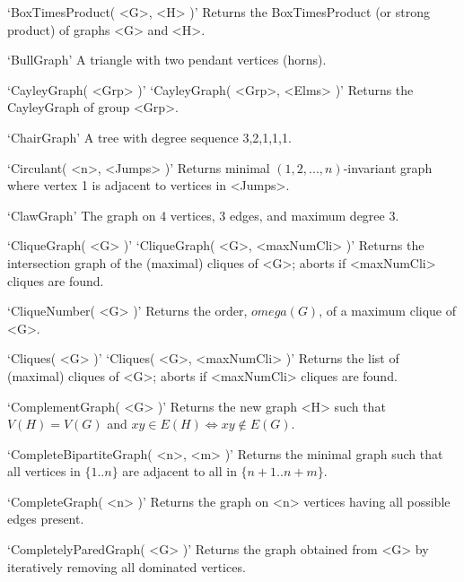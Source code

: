 `BoxTimesProduct( <G>, <H> )'\newline\hglue 5mm 
Returns the BoxTimesProduct (or strong product) of graphs <G> and <H>.

`BullGraph'\newline\hglue 5mm 
A triangle with two pendant vertices (horns).

`CayleyGraph( <Grp> )'\newline
`CayleyGraph( <Grp>, <Elms> )'\newline\hglue 5mm 
Returns the CayleyGraph of group <Grp>.

`ChairGraph'\newline\hglue 5mm 
A tree with degree sequence 3,2,1,1,1.

`Circulant( <n>, <Jumps> )'\newline\hglue 5mm 
Returns minimal $(1, 2, ..., n)$-invariant graph where vertex 1 is adjacent to vertices in <Jumps>.

`ClawGraph'\newline\hglue 5mm 
The graph on 4 vertices, 3 edges, and maximum degree 3.

`CliqueGraph( <G> )'\newline
`CliqueGraph( <G>, <maxNumCli> )'\newline\hglue 5mm 
Returns the intersection graph of the (maximal) cliques of <G>; aborts if <maxNumCli> cliques are found.

`CliqueNumber( <G> )'\newline\hglue 5mm 
Returns the order, $omega(G)$, of a maximum clique of <G>.

`Cliques( <G> )'\newline
`Cliques( <G>, <maxNumCli> )'\newline\hglue 5mm 
Returns the list of (maximal) cliques of <G>; aborts if <maxNumCli> cliques are found.

`ComplementGraph( <G> )'\newline\hglue 5mm 
Returns the new graph <H> such that  $V(H)=V(G)$ and $xy\in E(H) \iff xy \not\in E(G)$.

`CompleteBipartiteGraph( <n>, <m> )'\newline\hglue 5mm 
Returns the minimal graph such that all vertices in $\{1..n\}$ are adjacent to all in $\{n+1..n+m\}$.

`CompleteGraph( <n> )'\newline\hglue 5mm 
Returns the graph on <n> vertices having all possible edges present.

`CompletelyParedGraph( <G> )'\newline\hglue 5mm 
Returns the graph obtained from <G> by iteratively removing all dominated vertices. 


